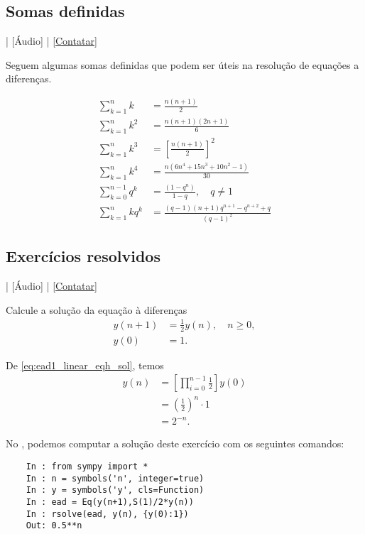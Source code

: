 \subsection{Somas definidas}\label{cap_ead1_sec_eqlin_subsec_sd}

\begin{flushright}
  [Vídeo] | [Áudio] | \href{https://phkonzen.github.io/notas/contato.html}{[Contatar]}
\end{flushright}

Seguem algumas somas definidas que podem ser úteis na resolução de equações a diferenças.

\begin{align}
  \sum_{k=1}^{n} k &= \frac{n(n+1)}{2}\\
  \sum_{k=1}^{n} k^2 &= \frac{n(n+1)(2n+1)}{6}\\
  \sum_{k=1}^n k^3 &= \left[\frac{n(n+1)}{2}\right]^2\\
  \sum_{k=1}^n k^4 &= \frac{n(6n^4+15n^3+10n^2-1)}{30}\\
  \sum_{k=0}^{n-1}q^k &= \frac{(1-q^n)}{1-q},\quad q\neq 1\label{eq:ead1_eqlin_spg}\\
  \sum_{k=1}^n kq^k &= \frac{(q-1)(n+1)q^{n+1}-q^{n+2}+q}{(q-1)^2}
\end{align}

\subsection*{Exercícios resolvidos}

\begin{flushright}
  [Vídeo] | [Áudio] | \href{https://phkonzen.github.io/notas/contato.html}{[Contatar]}
\end{flushright}

\begin{exeresol}
  Calcule a solução da equação à diferenças
  \begin{align}
    y(n+1) &= \frac{1}{2}y(n),\quad n\geq 0,\\
    y(0) &= 1.
  \end{align}
\end{exeresol}
\begin{resol}
  De \eqref{eq:ead1_linear_eqh_sol}, temos
  \begin{align}
    y(n) &= \left[\prod_{i=0}^{n-1} \frac{1}{2}\right]y(0)\\
    &= \left(\frac{1}{2}\right)^{n}\cdot 1 \\
    &= 2^{-n}.
  \end{align}

  \ifispython
  No \python, podemos computar a solução deste exercício com os seguintes comandos:
  \begin{lstlisting}
    In : from sympy import *
    In : n = symbols('n', integer=true)
    In : y = symbols('y', cls=Function)
    In : ead = Eq(y(n+1),S(1)/2*y(n))
    In : rsolve(ead, y(n), {y(0):1})
    Out: 0.5**n
  \end{lstlisting}
  \fi
\end{resol}

